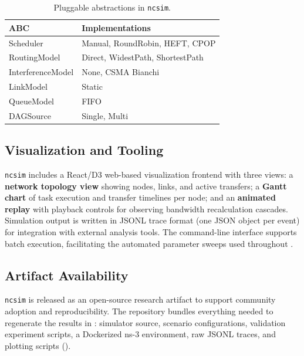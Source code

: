 \documentclass[conference]{IEEEtran}
\newcommand{\ncsim}{\texttt{ncsim}}
\begin{document}
\begin{table}[t]
\centering
\caption{Pluggable abstractions in \ncsim{}.}
\label{tab:abstractions}
\begin{tabular}{@{}lp{4.8cm}@{}}
\toprule
\textbf{ABC} & \textbf{Implementations} \\
\midrule
Scheduler & Manual, RoundRobin, HEFT, CPOP \\
RoutingModel & Direct, WidestPath, ShortestPath \\
InterferenceModel & None, CSMA Bianchi \\
LinkModel & Static \\
QueueModel & FIFO \\
DAGSource & Single, Multi \\
\bottomrule
\end{tabular}
\end{table}

\subsection{Visualization and Tooling}
\label{sec:viz}

\ncsim{} includes a React/D3 web-based visualization frontend with three
views: a \textbf{network topology view} showing nodes, links, and active
transfers; a \textbf{Gantt chart} of task execution and transfer timelines
per node; and an \textbf{animated replay} with playback controls for
observing bandwidth recalculation cascades.  Simulation output is written
in JSONL trace format (one JSON object per event) for integration with
external analysis tools.  The command-line interface supports batch
execution, facilitating the automated parameter sweeps used throughout
.

\subsection{Artifact Availability}
\label{sec:artifact}

\ncsim{} is released as an open-source research artifact to support
community adoption and reproducibility.  The repository bundles
everything needed to regenerate the results in
: simulator source, scenario
configurations, validation experiment scripts, a Dockerized ns-3
environment, raw JSONL traces, and plotting scripts
().
\end{document}
